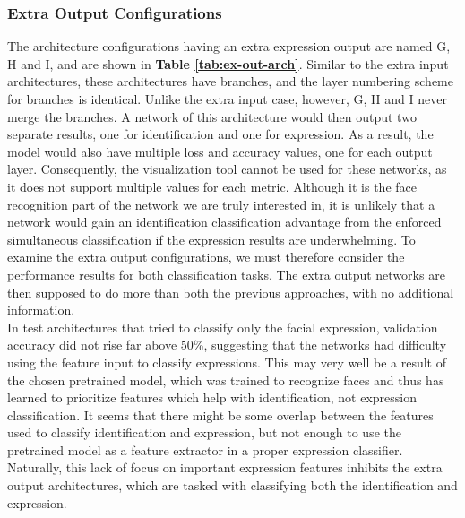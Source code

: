 \subsubsection{Extra Output Configurations}

The architecture configurations having an extra expression output are named G, H and I, and are shown in \textbf{Table \ref{tab:ex-out-arch}}. Similar to the extra input architectures, these architectures have branches, and the layer numbering scheme for branches is identical. Unlike the extra input case, however, G, H and I never merge the branches. A network of this architecture would then output two separate results, one for identification and one for expression. As a result, the model would also have multiple loss and accuracy values, one for each output layer. Consequently, the visualization tool cannot be used for these networks, as it does not support multiple values for each metric. Although it is the face recognition part of the network we are truly interested in, it is unlikely that a network would gain an identification classification advantage from the enforced simultaneous classification if the expression results are underwhelming. To examine the extra output configurations, we must therefore consider the performance results for both classification tasks. The extra output networks are then supposed to do more than both the previous approaches, with no additional information. \\

\noindent In test architectures that tried to classify only the facial expression, validation accuracy did not rise far above 50\%, suggesting that the networks had difficulty using the feature input to classify expressions. This may very well be a result of the chosen pretrained model, which was trained to recognize faces and thus has learned to prioritize features which help with identification, not expression classification. It seems that there might be some overlap between the features used to classify identification and expression, but not enough to use the pretrained model as a feature extractor in a proper expression classifier. Naturally, this lack of focus on important expression features inhibits the extra output architectures, which are tasked with classifying both the identification and expression. \\

